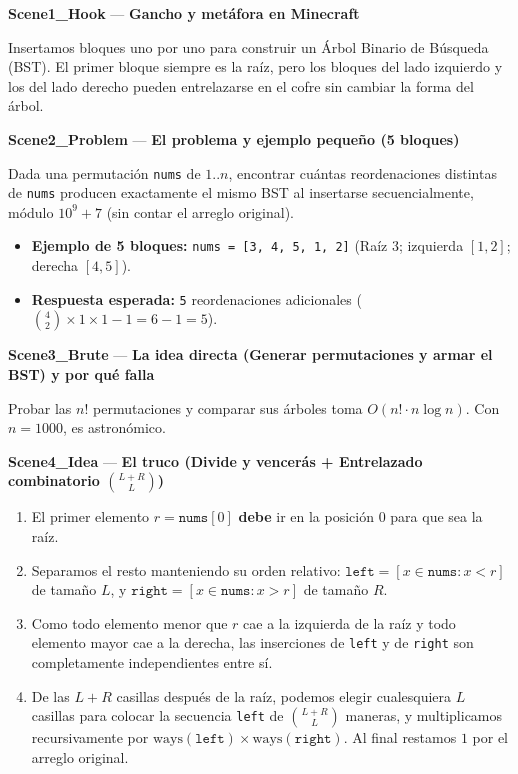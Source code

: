 \documentclass[letterpaper,10pt]{article}
\newcommand{\scene}[2]{\noindent\textbf{\textcolor{mcaqua}{#1}} --- \textbf{#2}\par\vspace{1pt}}
\begin{document}
\begin{shaded}
\scene{Scene1\_Hook}{Gancho y met\'afora en Minecraft}
Insertamos bloques uno por uno para construir un \'Arbol Binario de B\'usqueda (BST). El primer bloque siempre es la ra\'iz, pero los bloques del lado izquierdo y los del lado derecho pueden entrelazarse en el cofre sin cambiar la forma del \'arbol.

\scene{Scene2\_Problem}{El problema y ejemplo peque\~no (5 bloques)}
Dada una permutaci\'on \texttt{nums} de $1..n$, encontrar cu\'antas reordenaciones distintas de \texttt{nums} producen exactamente el mismo BST al insertarse secuencialmente, m\'odulo $10^9 + 7$ (sin contar el arreglo original).
\begin{itemize}\setlength{\itemsep}{1pt}
  \item \textbf{Ejemplo de 5 bloques:} \texttt{nums = [3, 4, 5, 1, 2]} (Ra\'iz $3$; izquierda $[1, 2]$; derecha $[4, 5]$).
  \item \textbf{Respuesta esperada:} \texttt{5} reordenaciones adicionales ($\binom{4}{2} \times 1 \times 1 - 1 = 6 - 1 = 5$).
\end{itemize}

\scene{Scene3\_Brute}{La idea directa (Generar permutaciones y armar el BST) y por qu\'e falla}
Probar las $n!$ permutaciones y comparar sus \'arboles toma $O(n! \cdot n \log n)$. Con $n = 1000$, es astron\'omico.

\scene{Scene4\_Idea}{El truco (Divide y vencer\'as + Entrelazado combinatorio $\binom{L+R}{L}$)}
\begin{enumerate}\setlength{\itemsep}{1pt}
  \item El primer elemento $r = \texttt{nums}[0]$ \textbf{debe} ir en la posici\'on $0$ para que sea la ra\'iz.
  \item Separamos el resto manteniendo su orden relativo: $\texttt{left} = [x \in \texttt{nums} : x < r]$ de tama\~no $L$, y $\texttt{right} = [x \in \texttt{nums} : x > r]$ de tama\~no $R$.
  \item Como todo elemento menor que $r$ cae a la izquierda de la ra\'iz y todo elemento mayor cae a la derecha, las inserciones de \texttt{left} y de \texttt{right} son completamente independientes entre s\'i.
  \item De las $L + R$ casillas despu\'es de la ra\'iz, podemos elegir cualesquiera $L$ casillas para colocar la secuencia \texttt{left} de $\binom{L + R}{L}$ maneras, y multiplicamos recursivamente por $\text{ways}(\texttt{left}) \times \text{ways}(\texttt{right})$. Al final restamos $1$ por el arreglo original.
\end{enumerate}


\end{shaded}
\end{document}
